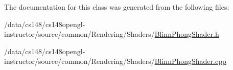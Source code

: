The documentation for this class was generated from the following files\+:\begin{DoxyCompactItemize}
\item 
/data/cs148/cs148opengl-\/instructor/source/common/\+Rendering/\+Shaders/\hyperlink{_blinn_phong_shader_8h}{Blinn\+Phong\+Shader.\+h}\item 
/data/cs148/cs148opengl-\/instructor/source/common/\+Rendering/\+Shaders/\hyperlink{_blinn_phong_shader_8cpp}{Blinn\+Phong\+Shader.\+cpp}\end{DoxyCompactItemize}

